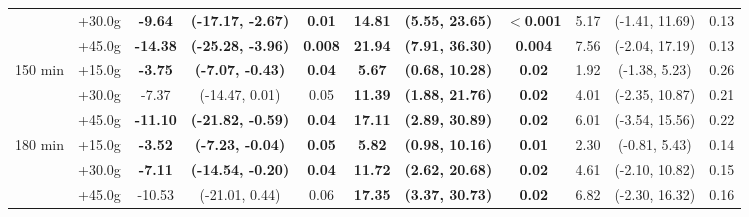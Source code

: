 \begin{table}[ht]
{\begin{tabular}{llccccccccc}
 & +30.0g & \textbf{-9.64} & \textbf{(-17.17, -2.67)} & \textbf{0.01} & \textbf{14.81} & \textbf{(5.55, 23.65)} & \textbf{$<$0.001} & 5.17 & (-1.41, 11.69) & 0.13 \\
 & +45.0g & \textbf{-14.38} & \textbf{(-25.28, -3.96)} & \textbf{0.008} & \textbf{21.94} & \textbf{(7.91, 36.30)} & \textbf{0.004} & 7.56 & (-2.04, 17.19) & 0.13 \\
\midrule
\multirow{3}{*}{150 min} & +15.0g & \textbf{-3.75} & \textbf{(-7.07, -0.43)} & \textbf{0.04} & \textbf{5.67} & \textbf{(0.68, 10.28)} & \textbf{0.02} & 1.92 & (-1.38, 5.23) & 0.26 \\
 & +30.0g & -7.37 & (-14.47, 0.01) & 0.05 & \textbf{11.39} & \textbf{(1.88, 21.76)} & \textbf{0.02} & 4.01 & (-2.35, 10.87) & 0.21 \\
 & +45.0g & \textbf{-11.10} & \textbf{(-21.82, -0.59)} & \textbf{0.04} & \textbf{17.11} & \textbf{(2.89, 30.89)} & \textbf{0.02} & 6.01 & (-3.54, 15.56) & 0.22 \\
\midrule
\multirow{3}{*}{180 min} & +15.0g & \textbf{-3.52} & \textbf{(-7.23, -0.04)} & \textbf{0.05} & \textbf{5.82} & \textbf{(0.98, 10.16)} & \textbf{0.01} & 2.30 & (-0.81, 5.43) & 0.14 \\
 & +30.0g & \textbf{-7.11} & \textbf{(-14.54, -0.20)} & \textbf{0.04} & \textbf{11.72} & \textbf{(2.62, 20.68)} & \textbf{0.02} & 4.61 & (-2.10, 10.82) & 0.15 \\
 & +45.0g & -10.53 & (-21.01, 0.44) & 0.06 & \textbf{17.35} & \textbf{(3.37, 30.73)} & \textbf{0.02} & 6.82 & (-2.30, 16.32) & 0.16 \\
\bottomrule
\end{tabular}%
}
\end{table}
